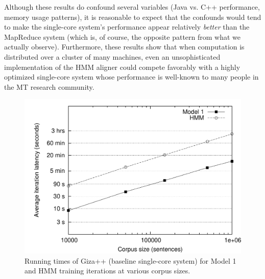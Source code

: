 Although these results do confound several variables (Java vs. C++
performance, memory usage patterns), it is reasonable to expect that
the confounds would tend to make the single-core system's performance
appear relatively \emph{better} than the MapReduce system (which is,
of course, the opposite pattern from what we actually observe).
Furthermore, these results show that when computation is distributed
over a cluster of many machines, even an unsophisticated
implementation of the HMM aligner could compete favorably with a
highly optimized single-core system whose performance is well-known to
many people in the MT research community.

\begin{figure}[p]
\begin{center}
\includegraphics[scale=0.6]{figures/fig-ch6-GIZA-timing.pdf}
\vspace{-0.3cm}
\end{center}\caption{Running times of Giza++ (baseline single-core system) for Model 1 and HMM training iterations at various corpus sizes.}\label{chapter6_figure_giza_timing}
\end{figure}

